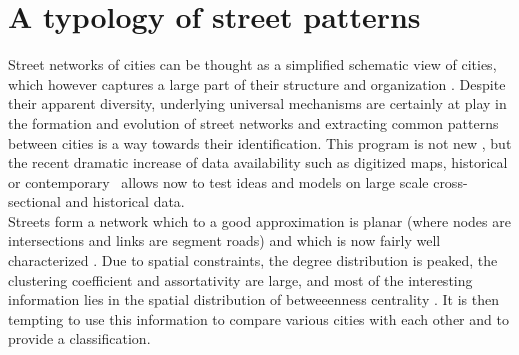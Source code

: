\chapter{A typology of street patterns}
\label{chap:typology}


Street networks of cities can be thought as a simplified schematic view of
cities, which however captures a large part of their structure and organization
\cite{Southworth:2003}.  Despite their apparent diversity, underlying universal
mechanisms are certainly at play in the formation and evolution of street
networks and extracting common patterns between cities is a way towards their
identification. This program is not new \cite{Haggett:1969}, but the
recent dramatic increase  of data availability such as digitized maps,
historical or
contemporary~\cite{Strano:2012,Barthelemy:2013,Porta:2014} allows now to test
ideas and models on large scale cross-sectional and historical data.\\

Streets form a network which to a good approximation is planar (where nodes are
intersections and links are segment roads) and which is now fairly well
characterized
\cite{Jiang:2004,Roswall:2005,Porta:2006,Porta:2006b,Lammer:2006,Crucitti:2006,Cardillo:2006,Xie:2007,Jiang:2007,Masucci:2009,Chan:2011,Courtat:2011}.
Due to spatial constraints, the degree distribution is peaked, the clustering
coefficient and assortativity are large, and most of the interesting information
lies in the spatial distribution of betweeenness centrality
\cite{Barthelemy:2011}. It is then tempting to use this information to compare
various cities with each other and to provide a classification. \\

